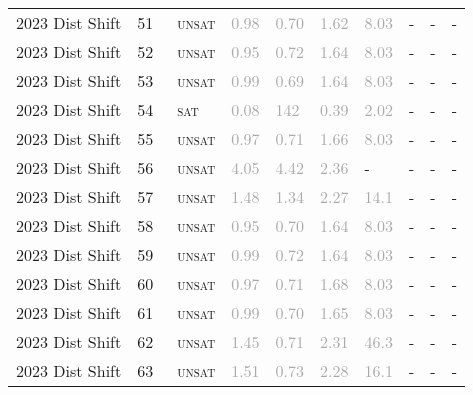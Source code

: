 \begin{center}
{\begin{longtable}{@{}llllllllll@{}}
2023 Dist Shift & 51 & ~\textsc{unsat} & \textcolor{darkgray}{0.98} & \textcolor{darkgray}{0.70} & \textcolor{darkgray}{1.62} & \textcolor{darkgray}{8.03} & - & - & - \\
2023 Dist Shift & 52 & ~\textsc{unsat} & \textcolor{darkgray}{0.95} & \textcolor{darkgray}{0.72} & \textcolor{darkgray}{1.64} & \textcolor{darkgray}{8.03} & - & - & - \\
2023 Dist Shift & 53 & ~\textsc{unsat} & \textcolor{darkgray}{0.99} & \textcolor{darkgray}{0.69} & \textcolor{darkgray}{1.64} & \textcolor{darkgray}{8.03} & - & - & - \\
2023 Dist Shift & 54 & ~\textsc{sat} & \textcolor{darkgray}{0.08} & \textcolor{darkgray}{142} & \textcolor{darkgray}{0.39} & \textcolor{darkgray}{2.02} & - & - & - \\
2023 Dist Shift & 55 & ~\textsc{unsat} & \textcolor{darkgray}{0.97} & \textcolor{darkgray}{0.71} & \textcolor{darkgray}{1.66} & \textcolor{darkgray}{8.03} & - & - & - \\
2023 Dist Shift & 56 & ~\textsc{unsat} & \textcolor{darkgray}{4.05} & \textcolor{darkgray}{4.42} & \textcolor{darkgray}{2.36} & - & - & - & - \\
2023 Dist Shift & 57 & ~\textsc{unsat} & \textcolor{darkgray}{1.48} & \textcolor{darkgray}{1.34} & \textcolor{darkgray}{2.27} & \textcolor{darkgray}{14.1} & - & - & - \\
2023 Dist Shift & 58 & ~\textsc{unsat} & \textcolor{darkgray}{0.95} & \textcolor{darkgray}{0.70} & \textcolor{darkgray}{1.64} & \textcolor{darkgray}{8.03} & - & - & - \\
2023 Dist Shift & 59 & ~\textsc{unsat} & \textcolor{darkgray}{0.99} & \textcolor{darkgray}{0.72} & \textcolor{darkgray}{1.64} & \textcolor{darkgray}{8.03} & - & - & - \\
2023 Dist Shift & 60 & ~\textsc{unsat} & \textcolor{darkgray}{0.97} & \textcolor{darkgray}{0.71} & \textcolor{darkgray}{1.68} & \textcolor{darkgray}{8.03} & - & - & - \\
2023 Dist Shift & 61 & ~\textsc{unsat} & \textcolor{darkgray}{0.99} & \textcolor{darkgray}{0.70} & \textcolor{darkgray}{1.65} & \textcolor{darkgray}{8.03} & - & - & - \\
2023 Dist Shift & 62 & ~\textsc{unsat} & \textcolor{darkgray}{1.45} & \textcolor{darkgray}{0.71} & \textcolor{darkgray}{2.31} & \textcolor{darkgray}{46.3} & - & - & - \\
2023 Dist Shift & 63 & ~\textsc{unsat} & \textcolor{darkgray}{1.51} & \textcolor{darkgray}{0.73} & \textcolor{darkgray}{2.28} & \textcolor{darkgray}{16.1} & - & - & - \\

\end{longtable}}
\end{center}
